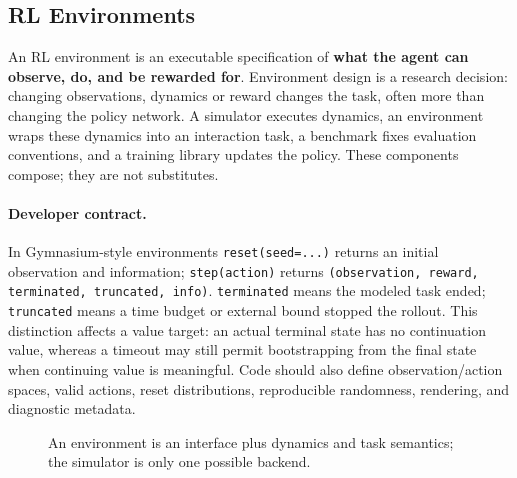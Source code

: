 \subsection{RL Environments}\label{sec:rl-environments}
An RL environment is an executable specification of \textbf{what the agent can observe, do, and be rewarded for}.
Environment design is a research decision: changing observations, dynamics or reward changes the task, often more than changing the policy network.
A simulator executes dynamics, an environment wraps these dynamics into an interaction task, a benchmark fixes evaluation conventions, and a training library updates the policy.
These components compose; they are not substitutes.

\paragraph{Developer contract.}
In Gymnasium-style environments \texttt{reset(seed=...)} returns an initial observation and information; \texttt{step(action)} returns \texttt{(observation, reward, terminated, truncated, info)}.
\texttt{terminated} means the modeled task ended; \texttt{truncated} means a time budget or external bound stopped the rollout.
This distinction affects a value target: an actual terminal state has no continuation value, whereas a timeout may still permit bootstrapping from the final state when continuing value is meaningful.
Code should also define observation/action spaces, valid actions, reset distributions, reproducible randomness, rendering, and diagnostic metadata.

\begin{figure}[!htbp]\centering
{}
\caption{An environment is an interface plus dynamics and task semantics; the simulator is only one possible backend.}
\end{figure}

